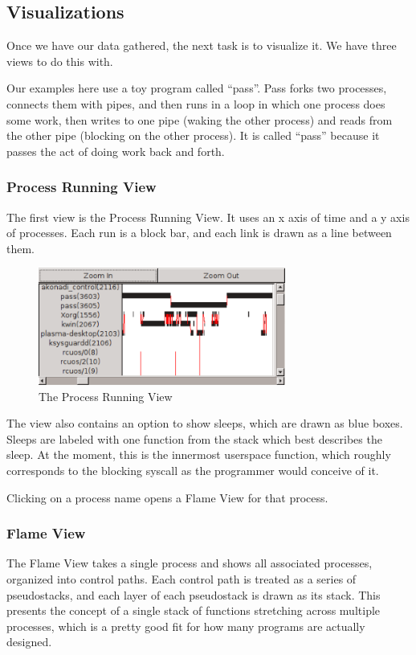 \documentclass[10pt]{article}
\begin{document}
\subsection{Visualizations}

Once we have our data gathered, the next task is to visualize it.  We have three views to do this with.

Our examples here use a toy program called ``pass''.  Pass forks two processes, connects them with pipes, and then runs in a loop in which one process does some work, then writes to one pipe (waking the other process) and reads from the other pipe (blocking on the other process).  It is called ``pass'' because it passes the act of doing work back and forth.

\subsubsection{Process Running View}

The first view is the Process Running View.  It uses an x axis of time and a y axis of processes.  Each run is a block bar, and each link is drawn as a line between them.

\begin{figure}[h!]
\includegraphics[width=3.2in]{images/screenshot}
\caption{The Process Running View}
\end{figure}

The view also contains an option to show sleeps, which are drawn as blue boxes.  Sleeps are labeled with one function from the stack which best describes the sleep.  At the moment, this is the innermost userspace function, which roughly corresponds to the blocking syscall as the programmer would conceive of it.

Clicking on a process name opens a Flame View for that process.

\subsubsection{Flame View}

The Flame View takes a single process and shows all associated processes, organized into control paths.  Each control path is treated as a series of pseudostacks, and each layer of each pseudostack is drawn as its stack.  This presents the concept of a single stack of functions stretching across multiple processes, which is a pretty good fit for how many programs are actually designed.
\end{document}
